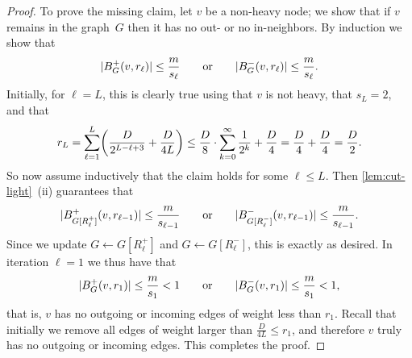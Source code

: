 \documentclass[letterpaper,11pt]{article}
\begin{document}
\begin{proof}
To prove the missing claim, let $v$ be a non-heavy node; we show that if $v$ remains in the graph~$G$ then it has no out- or no in-neighbors. By induction we show that
\begin{equation*}
    |B^+_G(v, r_\ell)| \leq \frac{m}{s_\ell} \qquad\text{or}\qquad |B^-_G(v, r_\ell)| \leq \frac{m}{s_\ell}.
\end{equation*}
Initially, for $\ell = L$, this is clearly true using that $v$ is not heavy, that $s_L = 2$, and that
\begin{equation*}
    r_L = \sum_{\ell=1}^L \parens*{\frac{D}{2^{L-\ell+3}} + \frac{D}{4L}} \leq \frac{D}{8} \cdot \sum_{k=0}^\infty \frac{1}{2^k} + \frac{D}{4} = \frac{D}{4} + \frac{D}{4} = \frac{D}{2}.
\end{equation*}
So now assume inductively that the claim holds for some $\ell \leq L$. Then \cref{lem:cut-light}~(ii) guarantees that
\begin{equation*}
    |B^+_{G[R^+_\ell]}(v, r_{\ell-1})| \leq \frac{m}{s_{\ell-1}} \qquad\text{or}\qquad |B^-_{G[R^-_\ell]}(v, r_{\ell-1})| \leq \frac{m}{s_{\ell-1}}.
\end{equation*}
Since we update $G \gets G[R^+_\ell]$ and $G \gets G[R^-_\ell]$, this is exactly as desired. In iteration $\ell = 1$ we thus have that 
\begin{equation*}
    |B^+_G(v, r_1)| \leq \frac{m}{s_1} < 1 \qquad\text{or}\qquad |B^-_G(v, r_1)| \leq \frac{m}{s_1} < 1,
\end{equation*}
that is, $v$ has no outgoing or incoming edges of weight less than $r_1$. Recall that initially we remove all edges of weight larger than $\frac{D}{4L} \leq r_1$, and therefore $v$ truly has no outgoing or incoming edges. This completes the proof.
\end{proof}
\end{document}
